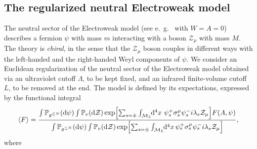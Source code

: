 \documentclass[a4paper, 11pt]{article}
\newcommand{\dgauss}[2]{\mathbb{P}_{#1}(\dd #2)}			%
\newcommand{\cutoff}{\Lambda}								%
\newcommand{\sing}[2]{{#1}^{#2}}							%
\theoremstyle{thm}
\begin{document}
\subsection{The regularized neutral Electroweak model}
\label{subsec:model_definition}

The neutral sector of the Electroweak model (see e.\ g.~\cite[Equation (14)]{Jackiw_Weinberg_1972} with $W=A=0$) describes a fermion $\psi$ with mass $m$ interacting with a boson $\mathcal{Z}_\mu$ with mass $M$. The theory is \emph{chiral}, in the sense that the $\mathcal{Z}_\mu$ boson couples in different ways with the left-handed and the right-handed Weyl components of $\psi$.
We consider an Euclidean regularization of the neutral sector of the Electroweak model obtained via an ultraviolet cutoff $\cutoff$, to be kept fixed, and an infrared finite-volume cutoff $L$, to be removed at the end.
The model is defined by its expectations, expressed by the functional integral
\begin{equation}
\expval{F} = \frac{\int \dgauss{\sing{g}{\le N}}{\psi}  \int \dgauss{v}{\mathcal{Z}} 
\exp[\sum_{s = \pm} \int_{\mathcal{M}_L} \!\! \dd[4]{x} \, \psi^+_s \sigma^\mu_s \psi^-_s i\lambda_s \mathcal{Z}_\mu] F(A,\psi)}{\int \dgauss{\sing{g}{\le N}}{\psi}  \int \dgauss{v}{\mathcal{Z}} 
\exp[\sum_{s = \pm} \int_{\mathcal{M}_L} \!\! \dd[4]{x} \psi^+_s \sigma^\mu_s \psi^-_s  i\lambda_s \mathcal{Z}_\mu]},
\end{equation}
where
\end{document}
